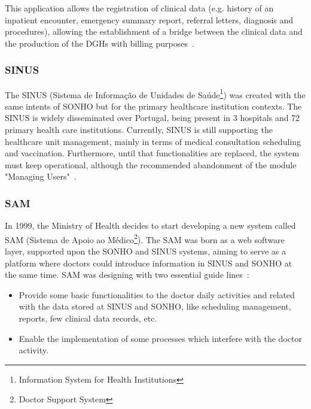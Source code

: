 This application allows the registration of clinical data (e.g. history of an inpatient encounter, emergency summary report, referral letters, diagnosis and procedures), allowing the establishment of a bridge between the clinical data and the production of the DGHs with billing purposes~\citep{GDHSONHO2011}.



\subsubsection{SINUS}

The SINUS (Sistema de Informação de Unidades de Saúde\footnote{Information System for Health Institutions}) was created with the same intents of SONHO but for the primary healthcare institution contexts. The SINUS is widely disseminated over Portugal, being present in 3 hospitals and 72 primary health care institutions. Currently, SINUS is still supporting the healthcare unit management, mainly in terms of medical consultation scheduling and vaccination. Furthermore, until that functionalities are replaced, the system must keep operational, although the recommended abandonment of the module "Managing Users"~\citep{Saude2010}.


\subsubsection{SAM}


In 1999, the Ministry of Health decides to start developing a new system called SAM (Sistema de Apoio ao Médico\footnote{Doctor Support System}). The SAM was born as a web software layer, supported upon the SONHO and SINUS systems, aiming to serve as a platform where doctors could introduce information in SINUS and SONHO at the same time. SAM was designing with two essential guide lines~\citep{Castanheira2005, ACSS_SAM2010}:
\begin{itemize}
\item Provide some basic functionalities to the doctor daily activities and related with the data stored at SINUS and SONHO, like scheduling management, reports, few clinical data records, etc.
\item Enable the implementation of some processes which interfere with the doctor activity.
\end{itemize}



